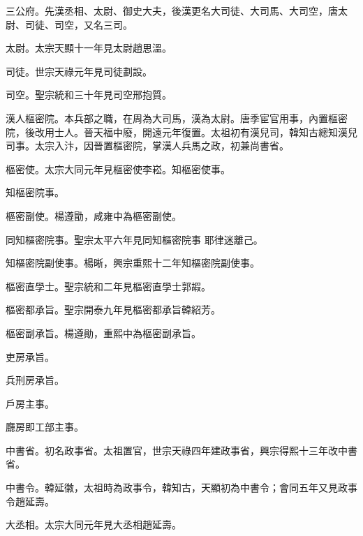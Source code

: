 \begin{pinyinscope}
 三公府。先漢丞相、太尉、御史大夫，後漢更名大司徒、大司馬、大司空，唐太尉、司徒、司空，又名三司。



 太尉。太宗天顯十一年見太尉趙思溫。



 司徒。世宗天祿元年見司徒劃設。



 司空。聖宗統和三十年見司空邢抱質。



 漢人樞密院。本兵部之職，在周為大司馬，漢為太尉。唐季宦官用事，內置樞密院，後改用士人。晉天福中廢，開遠元年復置。太祖初有漢兒司，韓知古總知漢兒司事。太宗入汴，因晉置樞密院，掌漢人兵馬之政，初兼尚書省。



 樞密使。太宗大同元年見樞密使李崧。知樞密使事。



 知樞密院事。



 樞密副使。楊遵勖，咸雍中為樞密副使。



 同知樞密院事。聖宗太平六年見同知樞密院事
 耶律迷離己。



 知樞密院副使事。楊晰，興宗重熙十二年知樞密院副使事。



 樞密直學士。聖宗統和二年見樞密直學士郭嘏。



 樞密都承旨。聖宗開泰九年見樞密都承旨韓紹芳。



 樞密副承旨。楊遵勛，重熙中為樞密副承旨。



 吏房承旨。



 兵刑房承旨。



 戶房主事。



 廳房即工部主事。



 中書省。初名政事省。太祖置官，世宗天祿四年建政事省，興宗得熙十三年改中書省。



 中書令。韓延徽，太祖時為政事令，韓知古，天顯初為中書令；會同五年又見政事令趙延壽。



 大丞相。太宗大同元年見大丞相趙延壽。




\end{pinyinscope}
